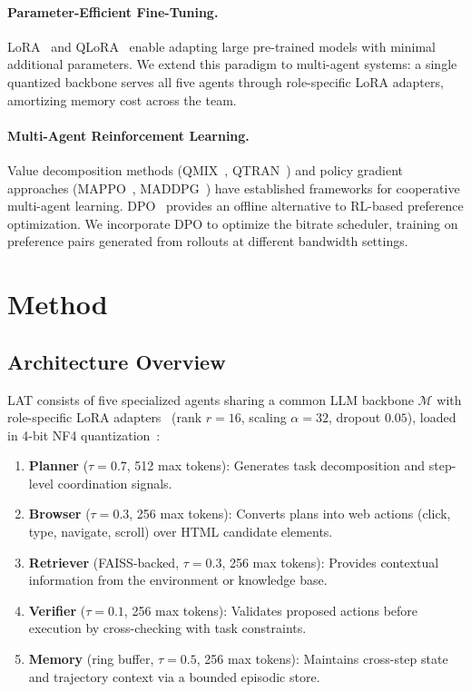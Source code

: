\documentclass{article}
\newcommand{\ours}{\textsc{LAT}}
\begin{document}
\paragraph{Parameter-Efficient Fine-Tuning.}
LoRA~\cite{hu2022lora} and QLoRA~\cite{dettmers2023qlora} enable adapting large pre-trained models with minimal additional parameters.
We extend this paradigm to multi-agent systems: a single quantized backbone serves all five agents through role-specific LoRA adapters, amortizing memory cost across the team.

\paragraph{Multi-Agent Reinforcement Learning.}
Value decomposition methods (QMIX~\cite{rashid2018qmix}, QTRAN~\cite{son2019qtran}) and policy gradient approaches (MAPPO~\cite{yu2022mappo}, MADDPG~\cite{lowe2017multi}) have established frameworks for cooperative multi-agent learning.
DPO~\cite{rafailov2023dpo} provides an offline alternative to RL-based preference optimization.
We incorporate DPO to optimize the bitrate scheduler, training on preference pairs generated from rollouts at different bandwidth settings.

\section{Method}
\label{sec:method}

\subsection{Architecture Overview}

\ours{} consists of five specialized agents sharing a common LLM backbone $\mathcal{M}$ with role-specific LoRA adapters~\cite{hu2022lora} (rank $r{=}16$, scaling $\alpha{=}32$, dropout $0.05$), loaded in 4-bit NF4 quantization~\cite{dettmers2023qlora}:

\begin{enumerate}[leftmargin=*,itemsep=1pt]
\item \textbf{Planner} ($\tau{=}0.7$, 512 max tokens): Generates task decomposition and step-level coordination signals.
\item \textbf{Browser} ($\tau{=}0.3$, 256 max tokens): Converts plans into web actions (click, type, navigate, scroll) over HTML candidate elements.
\item \textbf{Retriever} (FAISS-backed, $\tau{=}0.3$, 256 max tokens): Provides contextual information from the environment or knowledge base.
\item \textbf{Verifier} ($\tau{=}0.1$, 256 max tokens): Validates proposed actions before execution by cross-checking with task constraints.
\item \textbf{Memory} (ring buffer, $\tau{=}0.5$, 256 max tokens): Maintains cross-step state and trajectory context via a bounded episodic store.
\end{enumerate}
\end{document}
